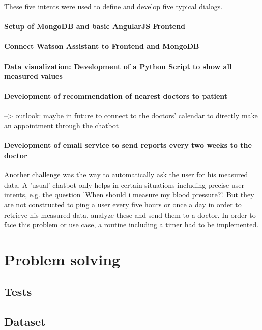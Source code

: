 These five intents were used to define and develop five typical dialogs.

\paragraph{Setup of MongoDB and basic AngularJS Frontend}

\paragraph{Connect Watson Assistant to Frontend and MongoDB}

\paragraph{Data visualization: Development of a Python Script to show all measured values}

\paragraph{Development of recommendation of nearest doctors to patient}
--> outlook: maybe in future to connect to the doctors' calendar to directly make an appointment through the chatbot

\paragraph{Development of email service to send reports every two weeks to the doctor}

Another challenge was the way to automatically ask the user for his measured data. A 'usual' chatbot only helps in certain situations including precise user intents, e.g. the question 'When should i measure my blood pressure?'. But they are not constructed to ping a user every five hours or once a day in order to retrieve his measured data, analyze these and send them to a doctor. 
In order to face this problem or use case, a routine including a timer had to be implemented.

\section{Problem solving}
\subsection{Tests}
\subsection{Dataset}
